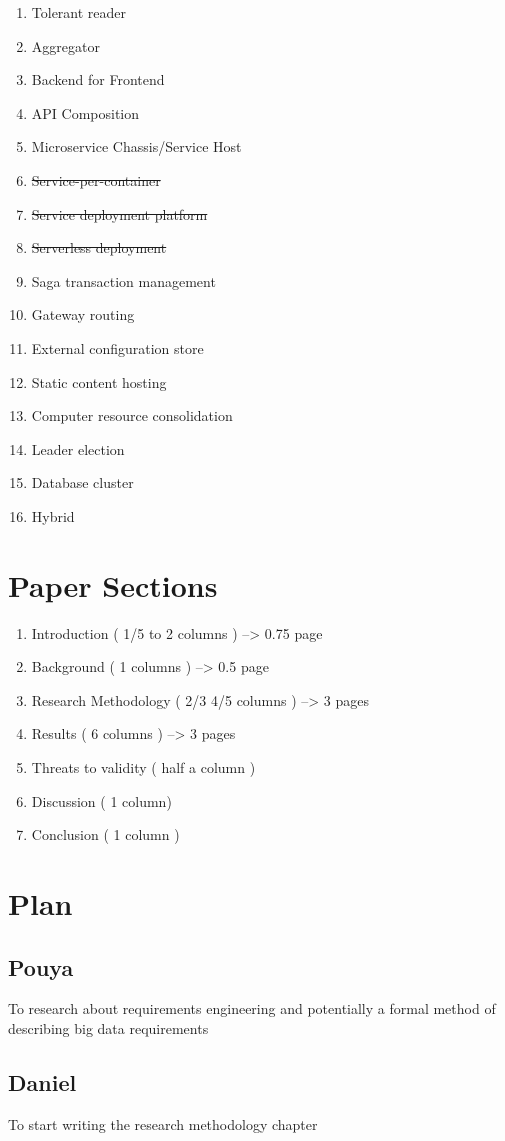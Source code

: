 \documentclass{article}
\theoremstyle{mytheoremstyle}
\theoremstyle{mytheoremstyle}
\theoremstyle{myproblemstyle}
\begin{document}
\begin{enumerate}
  \item Tolerant reader 
  \item Aggregator 
  \item Backend for Frontend 
  \item API Composition 
  \item Microservice Chassis/Service Host   
  \item \sout{Service-per-container}
  \item \sout{Service deployment platform}
  \item \sout{Serverless deployment} 
  \item Saga transaction management
  \item Gateway routing 
  \item External configuration store 
  \item Static content hosting 
  \item Computer resource consolidation 
  \item Leader election 
  \item Database cluster
  \item Hybrid
\end{enumerate}




\section{Paper Sections}

\begin{enumerate}
  \item Introduction ( 1/5 to 2 columns ) --> 0.75 page 
  \item Background ( 1 columns ) --> 0.5 page
  \item Research Methodology ( 2/3 4/5 columns ) --> 3 pages 
  \item Results ( 6 columns ) --> 3 pages 
  \item Threats to validity ( half a column ) 
  \item Discussion ( 1 column)
  \item Conclusion ( 1 column )
\end{enumerate}




\section{Plan}

\subsection{Pouya}
To research about requirements engineering and potentially a formal method of describing big data requirements 

\subsection{Daniel}
To start writing the research methodology chapter 
\end{document}
